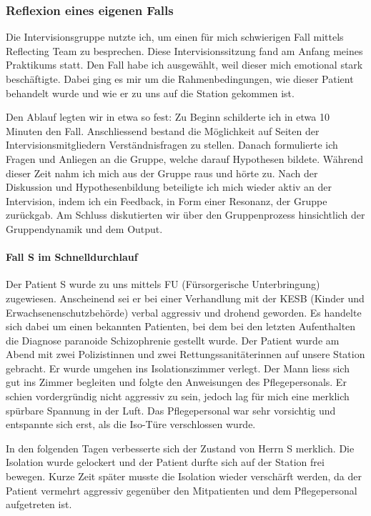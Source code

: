 \subsubsection{Reflexion eines eigenen Falls}
Die Intervisionsgruppe nutzte ich, um einen für mich  schwierigen Fall mittels Reflecting Team zu besprechen. Diese Intervisionssitzung fand am Anfang meines Praktikums statt. Den Fall habe ich ausgewählt, weil dieser mich emotional stark beschäftigte. Dabei ging es mir um die Rahmenbedingungen, wie dieser Patient behandelt wurde und wie er zu uns auf die Station gekommen ist. 

Den Ablauf legten wir in etwa so fest: Zu Beginn schilderte ich in etwa 10 Minuten den Fall. Anschliessend bestand die Möglichkeit auf Seiten der Intervisionsmitgliedern Verständnisfragen zu stellen. Danach formulierte ich Fragen und Anliegen an die Gruppe, welche darauf Hypothesen bildete. Während dieser Zeit nahm ich mich aus der Gruppe raus und hörte zu. Nach der Diskussion und Hypothesenbildung beteiligte ich mich wieder aktiv an der Intervision, indem ich ein Feedback, in Form einer Resonanz, der Gruppe zurückgab. Am Schluss diskutierten wir über den Gruppenprozess hinsichtlich der Gruppendynamik und dem Output.

\paragraph{Fall S im Schnelldurchlauf}
Der Patient S wurde zu uns mittels FU (Fürsorgerische Unterbringung) zugewiesen. Anscheinend sei er bei einer Verhandlung mit der KESB (Kinder und Erwachsenenschutzbehörde) verbal aggressiv und drohend geworden. Es handelte sich dabei um einen bekannten Patienten, bei dem bei den letzten Aufenthalten die Diagnose paranoide Schizophrenie gestellt wurde. Der Patient wurde am Abend mit zwei Polizistinnen und zwei Rettungssanitäterinnen auf unsere Station gebracht. Er wurde umgehen ins Isolationszimmer verlegt. Der Mann liess sich gut ins Zimmer begleiten und folgte den Anweisungen des Pflegepersonals. Er schien vordergründig nicht aggressiv zu sein, jedoch lag für mich eine merklich spürbare Spannung in der Luft. Das Pflegepersonal war sehr vorsichtig und entspannte sich erst, als die Iso-Türe verschlossen wurde.

In den folgenden Tagen verbesserte sich der Zustand von Herrn S merklich. Die Isolation wurde gelockert und der Patient durfte sich auf der Station frei bewegen. Kurze Zeit später musste die Isolation wieder verschärft werden, da der Patient vermehrt aggressiv gegenüber den Mitpatienten und dem Pflegepersonal aufgetreten ist. 

